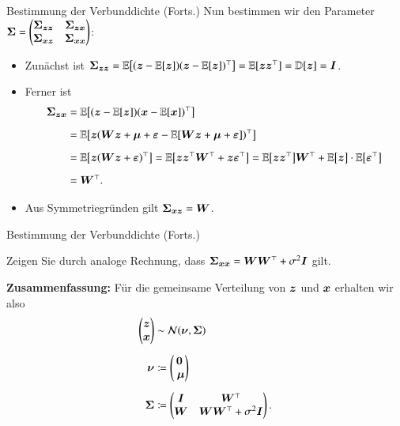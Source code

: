 \begin{frame}{Bestimmung der Verbunddichte (Forts.)}{}
	Nun bestimmen wir den Parameter
		$\bm{\Sigma} = \begin{pmatrix} \bm{\Sigma}_{\bm{z}\bm{z}} & \bm{\Sigma}_{\bm{z}\bm{x}} \\ \bm{\Sigma}_{\bm{x}\bm{z}} & \bm{\Sigma}_{\bm{x}\bm{x}} \end{pmatrix}$:
	\begin{itemize}
		\item Zunächst ist $\bm{\Sigma}_{\bm{z}\bm{z}} = \mathbb{E}\bigl[ (\bm{z} - \mathbb{E}[\bm{z}]) (\bm{z} - \mathbb{E}[\bm{z}])^\top \bigr] = \mathbb{E}[\bm{z} \bm{z}^\top] = \mathbb{D}[\bm{z}] = \bm{I}$.
		\item Ferner ist
		\begin{align*}
			\bm{\Sigma}_{\bm{z} \bm{x}}
				&= \mathbb{E}\bigl[ (\bm{z} - \mathbb{E}[\bm{z}]) (\bm{x} - \mathbb{E}[\bm{x}])^\top \bigr]
		\\[2mm]
				&= \mathbb{E}\bigl[\bm{z} (\bm{W} \bm{z} + \bm{\mu} + \bm{\varepsilon} - \mathbb{E}[\bm{W} \bm{z} + \bm{\mu} + \bm{\varepsilon}])^\top \bigr]
		\\[2mm]
				&= \mathbb{E}\bigl[\bm{z} (\bm{W} \bm{z} + \bm{\varepsilon})^\top \bigr]
					= \mathbb{E}\bigl[ \bm{z} \bm{z}^\top \bm{W}^\top + \bm{z} \bm{\varepsilon}^\top \bigr]
					= \mathbb{E}\bigl[ \bm{z} \bm{z}^\top \bigr] \bm{W}^\top  + \mathbb{E}\bigl[ \bm{z} \bigr] \cdot \mathbb{E}\bigl[ \bm{\varepsilon}^\top \bigr]
		\\[2mm]
				&= \bm{W}^\top.
		\end{align*}
		\item Aus Symmetriegründen gilt $\bm{\Sigma}_{\bm{x} \bm{z}} = \bm{W}$.
	\end{itemize}
\end{frame}


\begin{frame}{Bestimmung der Verbunddichte (Forts.)}{}
	\begin{mytask}
		Zeigen Sie durch analoge Rechnung, dass $\bm{\Sigma}_{\bm{x}\bm{x}} = \bm{W} \bm{W}^\top + \sigma^2 \bm{I}$ gilt.
	\end{mytask}
	
	\begin{boxGray}
		\textbf{Zusammenfassung:} Für die gemeinsame Verteilung von $\bm{z}$ und $\bm{x}$ erhalten wir also
		\begin{equation} \label{eq:ppca-joint-dist}
			\begin{aligned}
				\begin{pmatrix} \bz \\ \bx \end{pmatrix}
					&\sim \norm(\bnu, \bSigma)
			\\[2mm]
				\bnu
					&\coloneqq \begin{pmatrix} \0 \\ \bmu \end{pmatrix}
			\\[2mm]
				\bSigma
					&\coloneqq \begin{pmatrix} \bI & \bW^\top \\ \bW & \bW \bW^\top + \sigma^2 \bI \end{pmatrix}.
			\end{aligned}
		\end{equation}
	\end{boxGray}
\end{frame}


